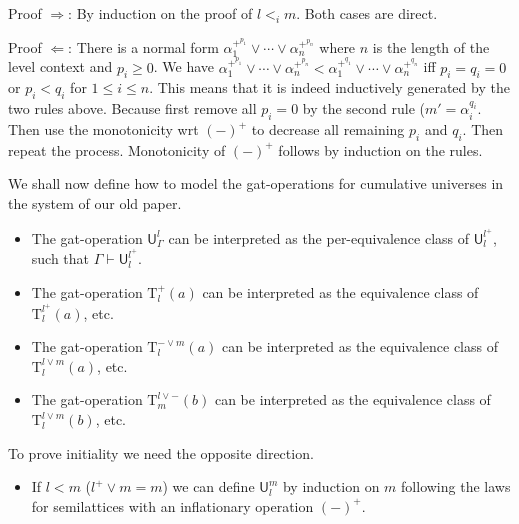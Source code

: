 \documentclass[11pt,a4paper]{article}
\theoremstyle{definition}
\newcommand{\UU}{\mathsf{U}}
\def\UU{\mathsf{U}}
\newcommand{\Ta}{\mathrm{T}}
\begin{document}
Proof $\Rightarrow$: By induction on the proof of $l <_i m$. Both cases are direct.

Proof $\Leftarrow$: There is a normal form 
$\alpha_1^{+^{p_1}} \vee \cdots \vee \alpha_n^{+^{p_n}}$ where $n$ is the length of the level context and $p_i \geq 0$. We have $\alpha_1^{+^{p_1}} \vee \cdots \vee \alpha_n^{+^{p_n}} < \alpha_1^{+^{q_1}} \vee \cdots \vee \alpha_n^{+^{q_n}}$ iff $p_i = q_i = 0$ or $p_i < q_i$ for $1 \le i \le n$. This means that it is indeed inductively generated by the two rules above. Because first remove all $p_i = 0$ by the second rule ($m' = \alpha_i^{q_i}$. Then use the monotonicity wrt $(-)^+$ to decrease all remaining $p_i$ and $q_i$. Then repeat the process. Monotonicity of $(-)^+$ follows by induction on the rules.

We shall now define how to model the gat-operations for cumulative universes in the system of our old paper.
\begin{itemize}
\item 
The gat-operation $\UU^l_\Gamma$ can be interpreted as the per-equivalence class of $\UU^{l^+}_l$, such that $\Gamma \vdash \UU^{l^+}_l$.
\item
The gat-operation $\Ta^+_l(a)$ can be interpreted as the equivalence class of $\Ta^{l^+}_l(a)$, etc.
\item
The gat-operation $\Ta^{-\vee m}_l(a)$ can be interpreted as the equivalence class of $\Ta^{l \vee m}_l(a)$, etc.
\item
The gat-operation $\Ta^{l\vee -}_m(b)$ can be interpreted as the equivalence class of $\Ta^{l \vee m}_l(b)$, etc.
\end{itemize}
To prove initiality we need the opposite direction.
\begin{itemize}
\item If $l < m$ ($l^+ \vee m = m$) we can define $\UU^m_l$ by induction on $m$ following the laws for semilattices with an inflationary operation $(-)^+$.
\end{itemize}











\end{document}
